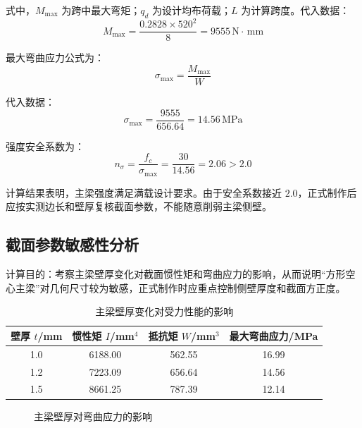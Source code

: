 \documentclass[UTF8,a4paper,12pt,fontset=none]{ctexart}
\numberwithin{equation}{section}
\numberwithin{figure}{section}
\numberwithin{table}{section}
\newcommand{\mm}{\,\mathrm{mm}}
\newcommand{\Nunit}{\,\mathrm{N}}
\newcommand{\MPa}{\,\mathrm{MPa}}
\begin{document}
式中，$M_{\max}$ 为跨中最大弯矩；$q_d$ 为设计均布荷载；$L$ 为计算跨度。代入数据：
\begin{equation}
  M_{\max}=\frac{0.2828\times520^2}{8}=9555\Nunit\cdot\mm
\end{equation}

最大弯曲应力公式为：
\begin{equation}
  \sigma_{\max}=\frac{M_{\max}}{W}
\end{equation}

代入数据：
\begin{equation}
  \sigma_{\max}=\frac{9555}{656.64}=14.56\MPa
\end{equation}

强度安全系数为：
\begin{equation}
  n_\sigma=\frac{f_c}{\sigma_{\max}}=\frac{30}{14.56}=2.06>2.0
\end{equation}

计算结果表明，主梁强度满足满载设计要求。由于安全系数接近 $2.0$，正式制作后应按实测边长和壁厚复核截面参数，不能随意削弱主梁侧壁。

\subsection{截面参数敏感性分析}
计算目的：考察主梁壁厚变化对截面惯性矩和弯曲应力的影响，从而说明“方形空心主梁”对几何尺寸较为敏感，正式制作时应重点控制侧壁厚度和截面方正度。

\begin{table}[H]
\centering
\caption{主梁壁厚变化对受力性能的影响}
\label{tab:thickness-sensitivity}
\begin{tabular}{c c c c}
\toprule
\textbf{壁厚 $t$}/mm & \textbf{惯性矩 $I$}/mm$^4$ & \textbf{抵抗矩 $W$}/mm$^3$ & \textbf{最大弯曲应力}/MPa \\\midrule
1.0 & 6188.00 & 562.55 & 16.99 \\
1.2 & 7223.09 & 656.64 & 14.56 \\
1.5 & 8661.25 & 787.39 & 12.14 \\
\bottomrule
\end{tabular}
\end{table}

\begin{figure}[H]
\centering
{}
\caption{主梁壁厚对弯曲应力的影响}
\label{fig:thickness-sensitivity}
\end{figure}
\end{document}
